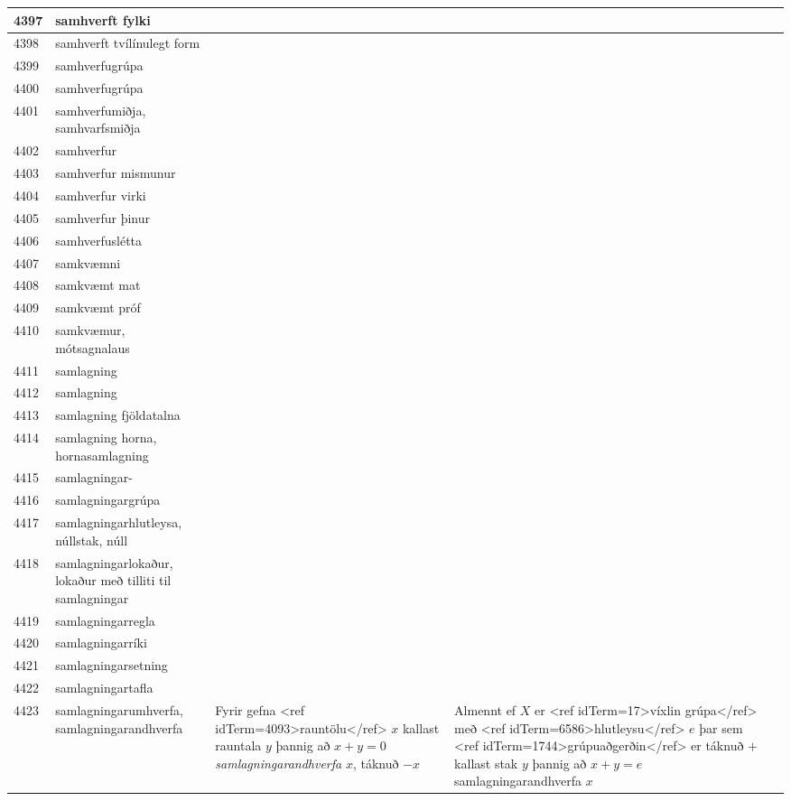\begin{longtable}{p{}|p{}|p{}|p{}|p{}}
\hline
4397 & samhverft fylki &  &  &  \\
\hline
4398 & samhverft tvílínulegt form &  &  &  \\
\hline
4399 & samhverfugrúpa &  &  &  \\
\hline
4400 & samhverfugrúpa &  &  &  \\
\hline
4401 & samhverfumiðja, samhvarfsmiðja &  &  &  \\
\hline
4402 & samhverfur &  &  &  \\
\hline
4403 & samhverfur mismunur &  &  &  \\
\hline
4404 & samhverfur virki &  &  &  \\
\hline
4405 & samhverfur þinur &  &  &  \\
\hline
4406 & samhverfuslétta &  &  &  \\
\hline
4407 & samkvæmni &  &  &  \\
\hline
4408 & samkvæmt mat &  &  &  \\
\hline
4409 & samkvæmt próf &  &  &  \\
\hline
4410 & samkvæmur, mótsagnalaus &  &  &  \\
\hline
4411 & samlagning &  &  &  \\
\hline
4412 & samlagning &  &  &  \\
\hline
4413 & samlagning fjöldatalna &  &  &  \\
\hline
4414 & samlagning horna, hornasamlagning &  &  &  \\
\hline
4415 & samlagningar- &  &  &  \\
\hline
4416 & samlagningargrúpa &  &  &  \\
\hline
4417 & samlagningarhlutleysa, núllstak, núll &  &  &  \\
\hline
4418 & samlagningarlokaður, lokaður með tilliti til samlagningar &  &  &  \\
\hline
4419 & samlagningarregla &  &  &  \\
\hline
4420 & samlagningarríki &  &  &  \\
\hline
4421 & samlagningarsetning &  &  &  \\
\hline
4422 & samlagningartafla &  &  &  \\
\hline
4423 & samlagningarumhverfa, samlagningarandhverfa & Fyrir gefna <ref idTerm=4093>rauntölu</ref> $x$ kallast rauntala $y$ þannig að $x+y=0$ \textit{samlagningarandhverfa} $x$, táknuð $-x$ & Almennt ef $X$ er <ref idTerm=17>víxlin grúpa</ref> með <ref idTerm=6586>hlutleysu</ref> $e$ þar sem <ref idTerm=1744>grúpuaðgerðin</ref> er táknuð $+$ kallast stak $y$ þannig að $x+y=e$ samlagningarandhverfa $x$ &  \\

\end{longtable}
